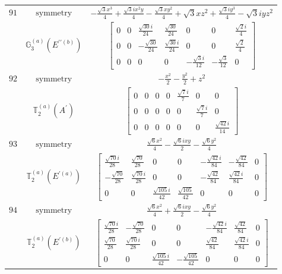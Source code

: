 \documentclass[fleqn,8pt,landscape]{jsarticle}
\begin{document}
\begin{longtable}{ccc}
$ 91 $ & $ \text{symmetry} $ & $ - \frac{\sqrt{3} x^{3}}{4} + \frac{\sqrt{3} i x^{2} y}{4} - \frac{\sqrt{3} x y^{2}}{4} + \sqrt{3} x z^{2} + \frac{\sqrt{3} i y^{3}}{4} - \sqrt{3} i y z^{2} $ \\
$  $ & $ \mathbb{G}_{3}^{(a)}(E^{\prime\prime(b)}) $ & $ \begin{bmatrix} 0 & 0 & \frac{\sqrt{30} i}{24} & \frac{\sqrt{30}}{24} & 0 & 0 & \frac{\sqrt{2} i}{4} \\ 0 & 0 & - \frac{\sqrt{30}}{24} & \frac{\sqrt{30} i}{24} & 0 & 0 & \frac{\sqrt{2}}{4} \\ 0 & 0 & 0 & 0 & - \frac{\sqrt{3} i}{12} & - \frac{\sqrt{3}}{12} & 0 \end{bmatrix} $ \\ \hline
$ 92 $ & $ \text{symmetry} $ & $ - \frac{x^{2}}{2} - \frac{y^{2}}{2} + z^{2} $ \\
$  $ & $ \mathbb{T}_{2}^{(a)}(A^{\prime}) $ & $ \begin{bmatrix} 0 & 0 & 0 & 0 & \frac{\sqrt{7} i}{7} & 0 & 0 \\ 0 & 0 & 0 & 0 & 0 & \frac{\sqrt{7} i}{7} & 0 \\ 0 & 0 & 0 & 0 & 0 & 0 & \frac{\sqrt{42} i}{14} \end{bmatrix} $ \\ \hline
$ 93 $ & $ \text{symmetry} $ & $ \frac{\sqrt{6} x^{2}}{4} - \frac{\sqrt{6} i x y}{2} - \frac{\sqrt{6} y^{2}}{4} $ \\
$  $ & $ \mathbb{T}_{2}^{(a)}(E^{\prime(a)}) $ & $ \begin{bmatrix} \frac{\sqrt{70} i}{28} & \frac{\sqrt{70}}{28} & 0 & 0 & - \frac{\sqrt{42} i}{84} & - \frac{\sqrt{42}}{84} & 0 \\ - \frac{\sqrt{70}}{28} & \frac{\sqrt{70} i}{28} & 0 & 0 & - \frac{\sqrt{42}}{84} & \frac{\sqrt{42} i}{84} & 0 \\ 0 & 0 & \frac{\sqrt{105} i}{42} & \frac{\sqrt{105}}{42} & 0 & 0 & 0 \end{bmatrix} $ \\ \hline
$ 94 $ & $ \text{symmetry} $ & $ \frac{\sqrt{6} x^{2}}{4} + \frac{\sqrt{6} i x y}{2} - \frac{\sqrt{6} y^{2}}{4} $ \\
$  $ & $ \mathbb{T}_{2}^{(a)}(E^{\prime(b)}) $ & $ \begin{bmatrix} \frac{\sqrt{70} i}{28} & - \frac{\sqrt{70}}{28} & 0 & 0 & - \frac{\sqrt{42} i}{84} & \frac{\sqrt{42}}{84} & 0 \\ \frac{\sqrt{70}}{28} & \frac{\sqrt{70} i}{28} & 0 & 0 & \frac{\sqrt{42}}{84} & \frac{\sqrt{42} i}{84} & 0 \\ 0 & 0 & \frac{\sqrt{105} i}{42} & - \frac{\sqrt{105}}{42} & 0 & 0 & 0 \end{bmatrix} $ \\ \hline

\end{longtable}
\end{document}
